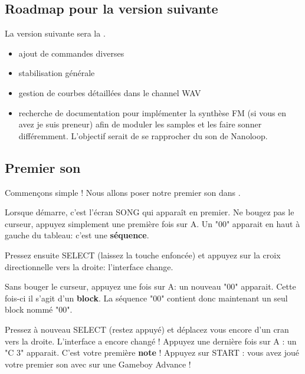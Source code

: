 \documentclass[12pt,a4paper]{article}
\begin{document}
    \subsection{Roadmap pour la version suivante}
    
    La version suivante sera la \fatnextversion. \medskip    
    \begin{itemize}
        \item{ajout de commandes diverses}
        \item{stabilisation générale}
        \item{gestion de courbes détaillées dans le channel WAV}
        \item{recherche de documentation pour implémenter la synthèse FM (si vous en avez je suis preneur) afin de moduler les samples et les faire sonner différemment.
                    L'objectif serait de se rapprocher du son de Nanoloop.}
    \end{itemize}
    
    \subsection{Premier son}

    Commençons simple ! Nous allons poser notre premier son dans \FAT.\medskip
    
    Lorsque \FAT démarre, c'est l'écran SONG qui apparaît en premier.
    Ne bougez pas le curseur, appuyez simplement une première fois sur A.
    Un "00" apparait en haut à gauche du tableau: c'est une {\bf séquence}.
    
    
    Pressez ensuite SELECT (laissez la touche enfoncée) et appuyez sur la croix directionnelle vers la droite: l'interface change.
    
    
    Sans bouger le curseur, appuyez une fois sur A: un nouveau "00" apparait.
    Cette fois-ci il s'agit d'un {\bf block}. La séquence "00" contient donc maintenant un seul block nommé "00".
    
        
    Pressez à nouveau SELECT (restez appuyé) et déplacez vous encore d'un cran vers la droite.
    L'interface a encore changé !
    Appuyez une dernière fois sur A : un "C 3" apparait.
    C'est votre première {\bf note} !
    Appuyez sur START : vous avez joué votre premier son avec \FAT sur une Gameboy Advance !
    
\end{document}
